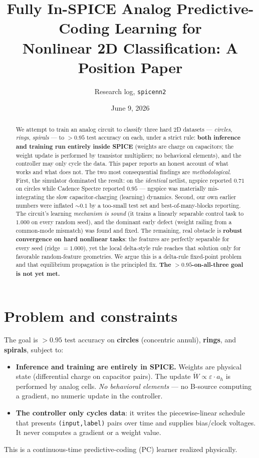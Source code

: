 \documentclass[11pt]{article}
\title{\textbf{Fully In-SPICE Analog Predictive-Coding Learning for\\ Nonlinear 2D Classification: A Position Paper}}
\author{Research log, \texttt{spicenn2}}
\date{June 9, 2026}
\newcommand{\ah}{a_h}
\begin{document}
\maketitle

\begin{abstract}
We attempt to train an analog circuit to classify three hard 2D datasets ---
\emph{circles}, \emph{rings}, \emph{spirals} --- to $>0.95$ test accuracy on each,
under a strict rule: \textbf{both inference and training run entirely inside SPICE}
(weights are charge on capacitors; the weight update is performed by transistor
multipliers; no behavioral elements), and the controller may only cycle the data.
This paper reports an honest account of what works and what does not. The two most
consequential findings are \emph{methodological}. First, the simulator dominated the
result: on the \emph{identical} netlist, ngspice reported $0.71$ on circles while
Cadence Spectre reported $0.95$ --- ngspice was materially mis-integrating the slow
capacitor-charging (learning) dynamics. Second, our own earlier numbers were inflated
$\sim0.1$ by a too-small test set and best-of-many-blocks reporting. The circuit's
learning \emph{mechanism is sound} (it trains a linearly separable control task to
$1.000$ on every random seed), and the dominant early defect (weight railing from a
common-mode mismatch) was found and fixed. The remaining, real obstacle is
\textbf{robust convergence on hard nonlinear tasks}: the features are perfectly
separable for every seed (ridge $=1.000$), yet the local delta-style rule reaches that
solution only for favorable random-feature geometries. We argue this is a delta-rule
fixed-point problem and that equilibrium propagation is the principled fix. \textbf{The
$>0.95$-on-all-three goal is not yet met.}
\end{abstract}

\section{Problem and constraints}
The goal is $>0.95$ test accuracy on \textbf{circles} (concentric annuli), \textbf{rings},
and \textbf{spirals}, subject to:
\begin{itemize}\setlength\itemsep{1pt}
\item \textbf{Inference and training are entirely in SPICE.} Weights are physical state
(differential charge on capacitor pairs). The update $\dot W \propto \varepsilon\cdot \ah$
is performed by analog cells. \emph{No behavioral elements} --- no B-source computing a
gradient, no numeric update in the controller.
\item \textbf{The controller only cycles data}: it writes the piecewise-linear schedule
that presents \texttt{(input,label)} pairs over time and supplies bias/clock voltages.
It never computes a gradient or a weight value.
\end{itemize}
This is a continuous-time predictive-coding (PC) learner realized physically.
\end{document}
